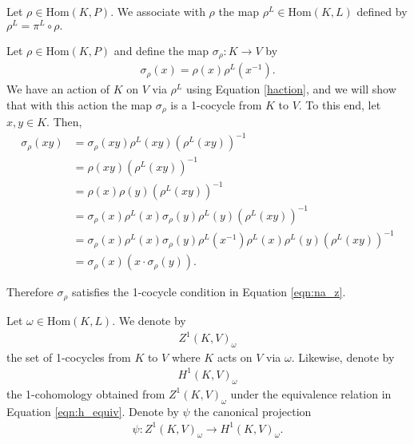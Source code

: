 \begin{definition} Let $\rho \in \mathrm{Hom}(K, P)$. We associate with $\rho$ the map $\rho^L \in \mathrm{Hom}(K, L)$ defined by
$\rho^L = \pi^L \circ \rho.$
\end{definition}

Let $\rho \in \mathrm{Hom}(K, P)$ and define the map $\sigma_\rho: K \rightarrow V$ by
\begin{align}\label{rho:alpha}
\sigma_\rho(x) = \rho(x)\rho^L(x^{-1}).
\end{align}
We have an action of $K$ on $V$ via $\rho^L$ using Equation \ref{haction}, and we will show that with this action the map $\sigma_\rho$ is a 1-cocycle from $K$ to $V$. To this end, let $x, y \in K$.
Then,
\begin{align*} \sigma_\rho(xy) &= \sigma_\rho(xy) \rho^L(xy) \left(\rho^L(xy)\right)^{-1} \\
	&= \rho(xy) \left(\rho^L(xy)\right)^{-1} \\
	&= \rho(x) \rho(y) \left(\rho^L(xy)\right)^{-1} \\
	&= \sigma_\rho(x) \rho^L(x) \sigma_\rho(y) \rho^L(y) \left(\rho^L(xy)\right)^{-1} \\
	&= \sigma_\rho(x) \rho^L(x) \sigma_\rho(y) \rho^L(x^{-1}) \rho^L(x) \rho^L(y) \left(\rho^L(xy)\right)^{-1} \\
	&= \sigma_\rho(x) \left(x \cdot \sigma_\rho(y)\right). 
\end{align*}

Therefore $\sigma_\rho$ satisfies the 1-cocycle condition in Equation \ref{eqn:na_z}.

\begin{definition}\label{h1sigma} Let $\omega \in \mathrm{Hom}(K, L)$. We denote by
\begin{align*} Z^1(K, V)_\omega \end{align*}
the set of 1-cocycles from $K$ to $V$ where $K$ acts on $V$ via $\omega$.
Likewise, denote by
\begin{align*} H^1(K, V)_\omega \end{align*}
the 1-cohomology obtained from $Z^1(K, V)_\omega$ under the equivalence relation in Equation \ref{eqn:h_equiv}. Denote by $\psi$ the canonical projection
\begin{align*} \psi : Z^1(K, V)_\omega \rightarrow H^1(K, V)_\omega. \end{align*}
\end{definition} 

